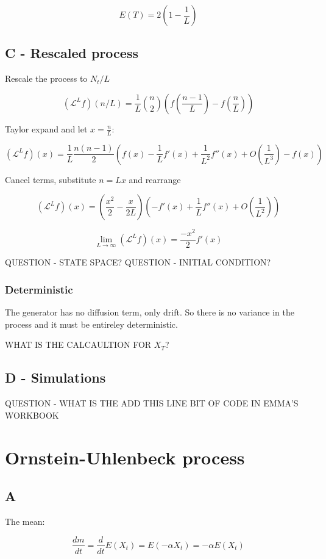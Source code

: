 \documentclass{article}
\begin{document}
$$E(T) = 2(1 - \frac{1}{L})$$


\subsection{C - Rescaled process}

Rescale the process to $N_t/L$

$$(\mathcal{L}^Lf)(n/L) = \frac{1}{L} {n\choose2} (f(\frac{n-1}{L}) - f(\frac{n}{L}))$$

Taylor expand and let $x=\frac{n}{L}$:

$$(\mathcal{L}^Lf)(x) = \frac{1}{L}\frac{n(n-1)}{2} (f(x) - \frac{1}{L}f'(x) + \frac{1}{L^2}f''(x) + O(\frac{1}{L^3}) - f(x))$$

Cancel terms, substitute $n=Lx$ and rearrange

$$(\mathcal{L}^Lf)(x) = (\frac{x^2}{2} - \frac{x}{2L})(- f'(x) + \frac{1}{L}f''(x) + O(\frac{1}{L^2}))$$

$$\lim_{L \to \infty} (\mathcal{L}^Lf)(x) = \frac{-x^2}{2}f'(x)$$



QUESTION - STATE SPACE?
QUESTION - INITIAL CONDITION?


\subsubsection{Deterministic}

The generator has no diffusion term, only drift. So there is no variance in the process and it must be entireley deterministic. 

WHAT IS THE CALCAULTION FOR $X_T$?



\subsection{D - Simulations}

QUESTION - WHAT IS THE ADD THIS LINE BIT OF CODE IN EMMA'S WORKBOOK

\section{Ornstein-Uhlenbeck process}

\subsection{A}

The mean:

$$\frac{dm}{dt} = \frac{d}{dt}E(X_t) = E(-\alpha X_t) = -\alpha E(X_t)$$
\end{document}

